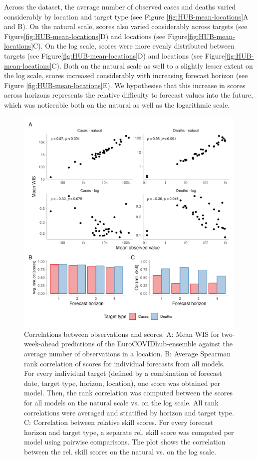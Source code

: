 \documentclass{article}
\begin{document}
Across the dataset, the average number of observed cases and deaths varied considerably by location and target type (see Figure \ref{fig:HUB-mean-locations}A and B). On the natural scale, scores also varied considerably across targets (see Figure\ref{fig:HUB-mean-locations}D) and locations (see Figure\ref{fig:HUB-mean-locations}C). On the log scale, scores were more evenly distributed between targets (see Figure\ref{fig:HUB-mean-locations}D) and locations (see Figure\ref{fig:HUB-mean-locations}C). Both on the natural scale as well to a slightly lesser extent on the log scale, scores increased considerably with increasing forecast horizon (see Figure \ref{fig:HUB-mean-locations}E). We hypothesise that this increase in scores across horizons represents the relative difficulty to forecast values into the future, which was noticeable both on the natural as well as the logarithmic scale. 

\begin{figure}[h!]
    \centering
    \includegraphics[width=0.99\textwidth]{output/figures/HUB-correlations.png}
    \caption{Correlations between observations and scores. A: Mean WIS for two-week-ahead predictions of the EuroCOVIDhub-ensemble against the average number of observations in a location. B: Average Spearman rank correlation of scores for individual forecasts from all models. For every individual target (defined by a combination of forecast date, target type, horizon, location), one score was obtained per model. Then, the rank correlation was computed between the scores for all models on the natural scale vs. on the log scale. All rank correlations were averaged and stratified by horizon and target type. C: Correlation between relative skill scores. For every forecast horizon and target type, a separate rel. skill score was computed per model using pairwise comparisons. The plot shows the correlation between the rel. skill scores on the natural vs. on the log scale.}
    \label{fig:HUB-cors}
\end{figure}
\end{document}
